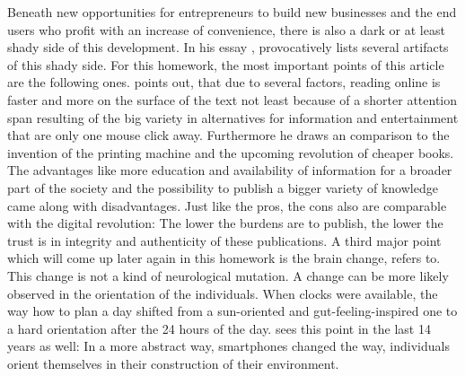 Beneath new opportunities for entrepreneurs to build new businesses and the end users who profit with an increase of convenience, there is also a dark or at least shady side of this development. In his essay , \cite[][]{Carr.2008} provocatively lists several artifacts of this shady side. For this homework, the most important points of this article are the following ones. \cite[][]{Carr.2008} points out, that due to several factors, reading online is faster and more on the surface of the text not least because of a shorter attention span resulting of the big variety in alternatives for information and entertainment that are only one mouse click away. Furthermore he draws an comparison to the invention of the printing machine and the upcoming revolution of cheaper books. The advantages like more education and availability of information for a broader part of the society and the possibility to publish a bigger variety of knowledge came along with disadvantages. Just like the pros, the cons also are comparable with the digital revolution: The lower the burdens are to publish, the lower the trust is in integrity and authenticity of these publications. A third major point which will come up later again in this homework is the brain change, \cite[][]{Carr.2008} refers to. This change is not a kind of neurological mutation. A change can be more likely observed in the orientation of the individuals. When clocks were available, the way how to plan a day shifted from a sun-oriented and gut-feeling-inspired one to a hard orientation after the 24 hours of the day. \cite[][]{Carr.2008} sees this point in the last 14 years as well: In a more abstract way, smartphones changed the way, individuals orient themselves in their construction of their environment.

